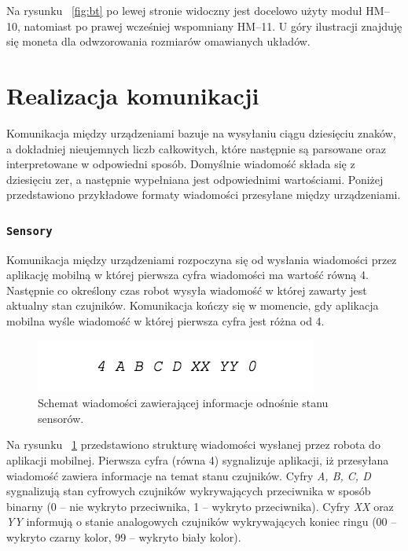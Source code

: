 Na rysunku ~\ref{fig:bt} po lewej stronie widoczny jest docelowo użyty moduł HM–10, natomiast po prawej wcześniej wspomniany HM–11. U góry ilustracji znajduję się moneta dla odwzorowania rozmiarów omawianych układów.

\section{Realizacja komunikacji}
Komunikacja między urządzeniami bazuje na wysyłaniu ciągu dziesięciu znaków, a dokładniej nieujemnych liczb całkowitych, które następnie są parsowane oraz interpretowane w odpowiedni sposób. Domyślnie wiadomość składa się z dziesięciu zer, a następnie wypełniana jest odpowiednimi wartościami. Poniżej przedstawiono przykładowe formaty wiadomości przesyłane między urządzeniami.

 \subsubsection{\lstinline$Sensory$}
Komunikacja między urządzeniami rozpoczyna się od wysłania wiadomości przez aplikację mobilną w której pierwsza cyfra wiadomości ma wartość równą 4. Następnie co określony czas robot wysyła wiadomość w której zawarty jest aktualny stan czujników. Komunikacja kończy się w momencie, gdy aplikacja mobilna wyśle wiadomość w której pierwsza cyfra jest różna od 4.

\begin{figure}[H]
	\centering
		\includegraphics[width=0.75\linewidth]{pic03/sensors.jpg}
	\caption{Schemat wiadomości zawierającej informacje odnośnie stanu sensorów.}
	\label{fig:sensors_communication}	
\end{figure}

Na rysunku ~\ref{fig:sensors_communication} przedstawiono strukturę wiadomości wysłanej przez robota do aplikacji mobilnej. Pierwsza cyfra (równa 4) sygnalizuje aplikacji, iż przesyłana wiadomość zawiera informacje na temat stanu czujników. Cyfry \textit{A, B, C, D} sygnalizują stan cyfrowych czujników wykrywających przeciwnika w sposób binarny (0 – nie wykryto przeciwnika, 1 – wykryto przeciwnika). Cyfry \textit{XX} oraz \textit{YY} informują o stanie analogowych czujników wykrywających koniec ringu (00 – wykryto czarny kolor, 99 – wykryto biały kolor).

